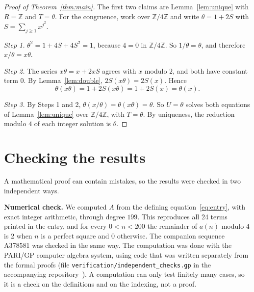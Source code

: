 \documentclass[11pt,a4paper]{article}
\theoremstyle{definition}
\theoremstyle{remark}
\newcommand{\Z}{\mathbb{Z}}
\newcommand{\para}[1]{\par\medskip\noindent\textbf{#1}\enspace}
\begin{document}
\begin{proof}[Proof of Theorem~\ref{thm:main}]
The first two claims are Lemma~\ref{lem:unique} with $R=\Z$ and $T=\theta$. For the congruence, work over $\Z/4\Z$ and
write $\theta=1+2S$ with $S=\sum_{j\ge1}x^{j^2}$.

\emph{Step 1.} $\theta^2=1+4S+4S^2=1$, because $4=0$ in $\Z/4\Z$. So $1/\theta=\theta$, and therefore
$x/\theta=x\theta$.

\emph{Step 2.} The series $x\theta=x+2xS$ agrees with $x$ modulo $2$, and both have constant term $0$. By
Lemma~\ref{lem:double}, $2S(x\theta)=2S(x)$. Hence
\[
\theta(x\theta)=1+2S(x\theta)=1+2S(x)=\theta(x).
\]

\emph{Step 3.} By Steps 1 and 2, $\theta(x/\theta)=\theta(x\theta)=\theta$. So $U=\theta$ solves both equations of
Lemma~\ref{lem:unique} over $\Z/4\Z$, with $T=\theta$. By uniqueness, the reduction modulo $4$ of each integer solution
is $\theta$.
\end{proof}

\section{Checking the results}\label{sec:checks}

A mathematical proof can contain mistakes, so the results were checked in two independent ways.

\para{Numerical check.}
We computed $A$ from the defining equation~\eqref{eq:entry}, with exact integer arithmetic, through degree
$199$. This reproduces all 24 terms printed in the entry, and for every $0<n<200$ the remainder of
$a(n)$ modulo $4$ is $2$ when $n$ is a perfect square and $0$ otherwise. The companion sequence A378581 was
checked in the same way.
The computation was done with the PARI/GP computer algebra system, using code that was written separately from the
formal proofs (file \texttt{verification/independent\_checks.gp} in the accompanying repository~\cite{repo}).
A computation can only test finitely many cases, so it is a check on the definitions and on the indexing, not a proof.
\end{document}
